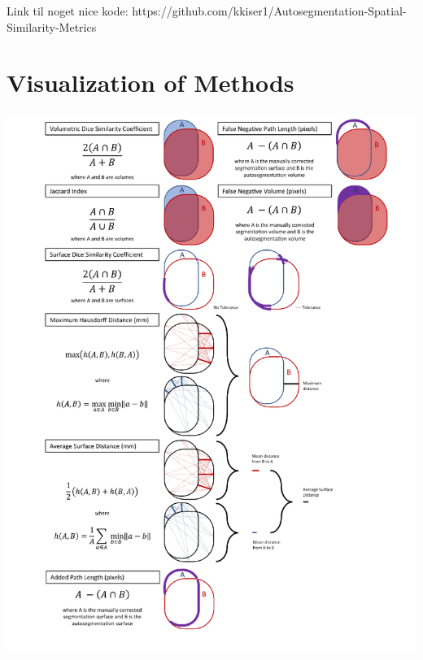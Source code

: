 \documentclass[a4paper, 11pt]{report}
\begin{document}
Link til noget nice kode: https://github.com/kkiser1/Autosegmentation-Spatial-Similarity-Metrics

\section*{Visualization of Methods}

\includegraphics[width=1.0\textwidth]{methods}
\end{document}
